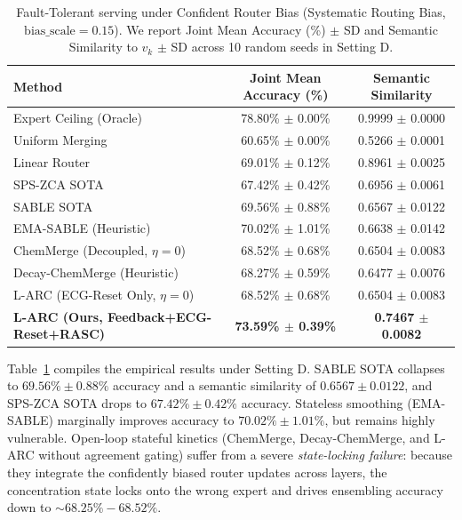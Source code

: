 \begin{table}[h]
\caption{Fault-Tolerant serving under Confident Router Bias (Systematic Routing Bias, $\text{bias\_scale} = 0.15$). We report Joint Mean Accuracy (\%) $\pm$ SD and Semantic Similarity to $v_k$ $\pm$ SD across 10 random seeds in Setting D.}
\label{tab:bias_results}
\vskip 0.15in
\begin{center}
\begin{small}
\begin{tabular}{lcc}
\toprule
Method & Joint Mean Accuracy (\%) & Semantic Similarity \\
\midrule
Expert Ceiling (Oracle) & 78.80\% $\pm$ 0.00\% & 0.9999 $\pm$ 0.0000 \\
Uniform Merging & 60.65\% $\pm$ 0.00\% & 0.5266 $\pm$ 0.0001 \\
Linear Router & 69.01\% $\pm$ 0.12\% & 0.8961 $\pm$ 0.0025 \\
SPS-ZCA SOTA \cite{spszca2025} & 67.42\% $\pm$ 0.42\% & 0.6956 $\pm$ 0.0061 \\
SABLE SOTA \cite{sable2025} & 69.56\% $\pm$ 0.88\% & 0.6567 $\pm$ 0.0122 \\
EMA-SABLE (Heuristic) & 70.02\% $\pm$ 1.01\% & 0.6638 $\pm$ 0.0142 \\
ChemMerge (Decoupled, $\eta=0$) & 68.52\% $\pm$ 0.68\% & 0.6504 $\pm$ 0.0083 \\
Decay-ChemMerge (Heuristic) & 68.27\% $\pm$ 0.59\% & 0.6477 $\pm$ 0.0076 \\
L-ARC (ECG-Reset Only, $\eta=0$) & 68.52\% $\pm$ 0.68\% & 0.6504 $\pm$ 0.0083 \\
\midrule
\textbf{L-ARC (Ours, Feedback+ECG-Reset+RASC)} & \textbf{73.59\% $\pm$ 0.39\%} & \textbf{0.7467 $\pm$ 0.0082} \\
\bottomrule
\end{tabular}
\end{small}
\end{center}
\vskip -0.1in
\end{table}

Table~\ref{tab:bias_results} compiles the empirical results under Setting D. SABLE SOTA collapses to $69.56\% \pm 0.88\%$ accuracy and a semantic similarity of $0.6567 \pm 0.0122$, and SPS-ZCA SOTA drops to $67.42\% \pm 0.42\%$ accuracy. Stateless smoothing (EMA-SABLE) marginally improves accuracy to $70.02\% \pm 1.01\%$, but remains highly vulnerable. Open-loop stateful kinetics (ChemMerge, Decay-ChemMerge, and L-ARC without agreement gating) suffer from a severe \emph{state-locking failure}: because they integrate the confidently biased router updates across layers, the concentration state locks onto the wrong expert and drives ensembling accuracy down to $\sim 68.25\% - 68.52\%$.

